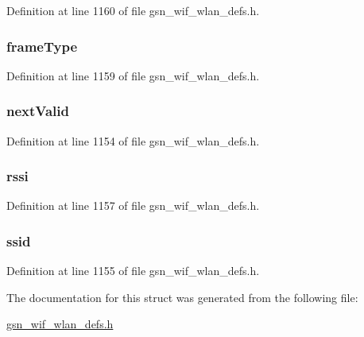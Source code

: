 Definition at line 1160 of file gsn\_\-wif\_\-wlan\_\-defs.h.

\hypertarget{a00400_aa94997d83b2de77c11b392c55081d2a9}{
\subsubsection[{frameType}]{ {\bf frameType}}}
\label{a00400_aa94997d83b2de77c11b392c55081d2a9}


Definition at line 1159 of file gsn\_\-wif\_\-wlan\_\-defs.h.

\hypertarget{a00400_a9c89aaf009cfded452a388795b06318f}{
\subsubsection[{nextValid}]{ {\bf nextValid}}}
\label{a00400_a9c89aaf009cfded452a388795b06318f}


Definition at line 1154 of file gsn\_\-wif\_\-wlan\_\-defs.h.

\hypertarget{a00400_a640aff00cf10c51413e56e7846dc5089}{
\subsubsection[{rssi}]{ {\bf rssi}}}
\label{a00400_a640aff00cf10c51413e56e7846dc5089}


Definition at line 1157 of file gsn\_\-wif\_\-wlan\_\-defs.h.

\hypertarget{a00400_a9bcb2e5a0dbdd5461faec24950cf7459}{
\subsubsection[{ssid}]{ {\bf ssid}}}
\label{a00400_a9bcb2e5a0dbdd5461faec24950cf7459}


Definition at line 1155 of file gsn\_\-wif\_\-wlan\_\-defs.h.



The documentation for this struct was generated from the following file:\begin{DoxyCompactItemize}
\item 
\hyperlink{a00613}{gsn\_\-wif\_\-wlan\_\-defs.h}\end{DoxyCompactItemize}
